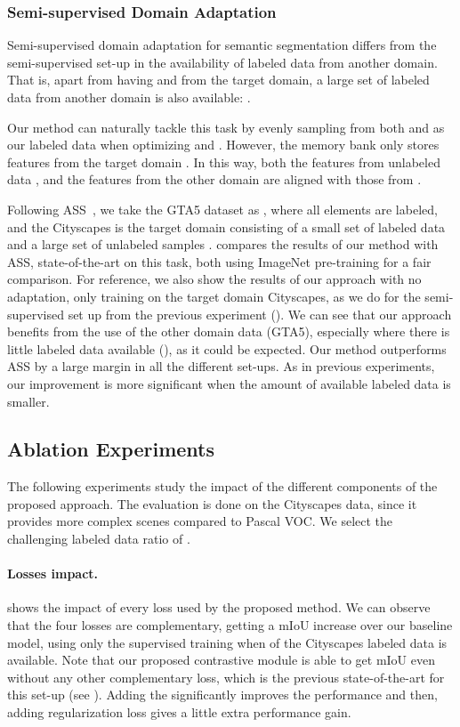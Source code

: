 \documentclass[10pt,twocolumn,letterpaper]{article}
\begin{document}
\subsubsection{Semi-supervised Domain Adaptation}
Semi-supervised domain adaptation for semantic segmentation differs from the semi-supervised set-up in the availability of labeled data from another domain. That is, apart from having  and  from the target domain, a large set of labeled data from another domain is also available: .
 
Our method can naturally tackle this task by evenly sampling from both  and  as our labeled data when optimizing  and . However, the memory bank only stores features from the target domain . 
In this way, both the features from unlabeled data , and the features from the other domain  are aligned with those from .


Following ASS~\cite{wang2020alleviating}, we take the GTA5 dataset as , where all elements are labeled, and the Cityscapes is the target domain consisting of a small set of labeled data  and a large set of unlabeled samples .  compares the results of our method with ASS, state-of-the-art on this task, both using ImageNet pre-training for a fair comparison. 
For reference, we also show the results of our approach with no adaptation, \ie only training on the target domain Cityscapes, as we do for the semi-supervised set up from the previous
experiment (). We can see that our approach benefits from the use of the other domain data (GTA5), especially where there is little labeled data available (), as it could be expected. 
Our method outperforms ASS by a large margin in all the different set-ups. As in previous experiments, our improvement is more significant when the amount of available labeled data is smaller. 


\subsection{Ablation Experiments}
 \label{sec:ablation}
The following experiments study the impact of the different components of the proposed approach. The evaluation is done on the Cityscapes data, since it provides more complex scenes compared to Pascal VOC. We select the challenging labeled data ratio of . 
 

\paragraph{Losses impact.}  shows the impact of every loss used by the proposed method.
We can observe that the four losses are complementary, getting a  mIoU increase over our baseline model, using only the supervised training when  of the Cityscapes labeled data is available. Note that our proposed contrastive module  is able to get  mIoU even without any other complementary loss, which is the previous state-of-the-art for this set-up (see ). Adding the  significantly improves the performance and then, adding  regularization loss gives a little extra performance gain. 
\end{document}
